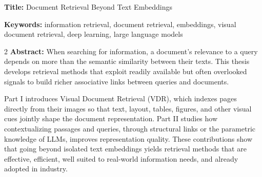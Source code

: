 \begin{mdframed}[linecolor=Prune,linewidth=1]
\textbf{Title:} Document Retrieval Beyond Text Embeddings

\noindent \textbf{Keywords:} information retrieval, document retrieval, embeddings, visual document retrieval, deep learning, large language models

\begin{multicols}{2}
\noindent \textbf{Abstract:} When searching for information, a document’s relevance to a query depends on more than the semantic similarity between their texts. This thesis develops retrieval methods that exploit readily available but often overlooked signals to build richer associative links between queries and documents.

Part I introduces Visual Document Retrieval (VDR), which indexes pages directly from their images so that text, layout, tables, figures, and other visual cues jointly shape the document representation. Part II studies how contextualizing passages and queries, through structural links or the parametric knowledge of LLMs, improves representation quality. These contributions show that going beyond isolated text embeddings yields retrieval methods that are effective, efficient, well suited to real-world information needs, and already adopted in industry.
\end{multicols}
\end{mdframed}

\clearpage
\restoregeometry
\normalfont

